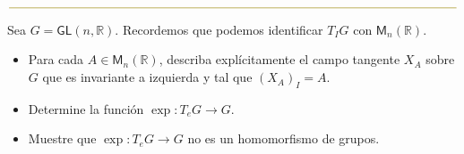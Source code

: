 \documentclass[11pt]{article}
\newcommand{\R}{\mathbb{R}}
\newcommand{\paint}[1]{\color{color}{#1}}
\newenvironment{exercise}[2][Ejercicio]{\begin{trivlist}
\item[\hskip \labelsep \paint{{\bfseries #1}}\hskip \labelsep {\bfseries #2.}]}{\end{trivlist}}
\begin{document}
\begin{center}
$\paint{
\rule{400pt}{0.5pt}
}$
\vspace{10pt}
\end{center}

\begin{exercise}{10} Sea $G=\mathsf{GL}(n,\R)$. Recordemos que podemos identificar $T_IG$
con $\mathsf{M}_n(\R)$. 
\begin{itemize}[listparindent = \parindent]
\item[a)] Para cada $A\in \mathsf{M}_n(\R)$, describa explícitamente el campo tangente
$X_A$ sobre $G$ que es invariante a izquierda y tal que $(X_A)_I=A$.
\item[b)] Determine la funci\'on $\exp:T_eG\to G$.
\item[c)] Muestre que $\exp:T_eG\to G$ no es un homomorfismo de grupos.
\end{itemize}
\end{exercise}
\end{document}
